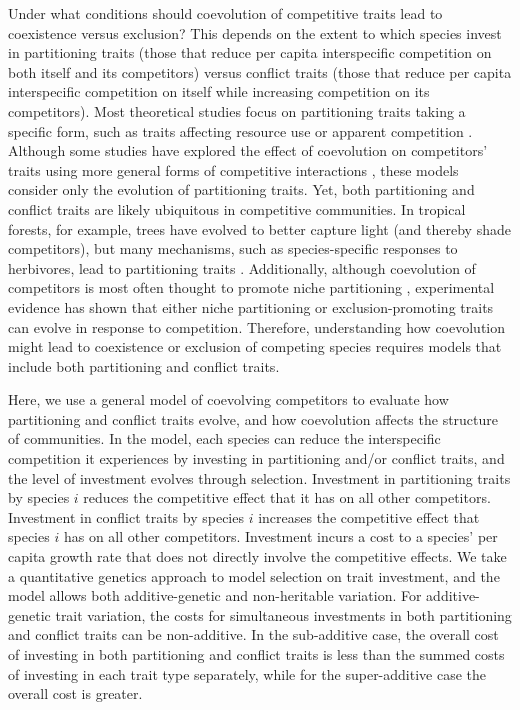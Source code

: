 Under what conditions should coevolution of competitive traits lead to
coexistence versus exclusion? This depends on the extent to which species 
invest in partitioning traits (those that reduce per capita interspecific
competition on both itself and its competitors) versus conflict traits
(those that reduce per capita interspecific competition on itself while
increasing competition on its competitors). Most theoretical studies focus 
on partitioning traits taking a specific form, such as traits affecting 
resource use
\citep[e.g.,][]{Roughgarden1976, Shoresh2008} or apparent
competition \citep[e.g.,][]{Abrams1998, Abrams2002, Schreiber2011}.
Although some studies have explored the effect of coevolution on 
competitors’ traits using more general forms of competitive 
interactions \citep[e.g.,][]{Abrams2013, Pastore2021, Vasseur2011a}, these
models consider only the evolution of partitioning traits. Yet, both
partitioning and conflict traits are likely ubiquitous in competitive
communities. In tropical forests, for example, trees have evolved to
better capture light (and thereby shade competitors), but many
mechanisms, such as species-specific responses to herbivores, lead to
partitioning traits \citep{Wright2002}. Additionally, although coevolution of
competitors is most often thought to promote niche partitioning 
\citep{Pfennig2012}, experimental evidence has shown that either niche
partitioning \citep{Schluter1994, Zuppinger-Dingley2014} or
exclusion-promoting traits \citep{Germain2020, Hart2019, Miller2014, Zhao2016}
can evolve in response to competition. 
Therefore, understanding how coevolution might lead to coexistence or
exclusion of competing species requires models that include both
partitioning and conflict traits.

Here, we use a general model of coevolving competitors to evaluate how
partitioning and conflict traits evolve, and how coevolution affects the
structure of communities. In the model, each species can reduce the
interspecific competition it experiences by investing in partitioning
and/or conflict traits, and the level of investment evolves through
selection. Investment in partitioning traits by species $i$ reduces
the competitive effect that it has on all other competitors.
Investment in conflict traits by species $i$ increases the competitive
effect that species $i$ has on all other competitors. Investment
incurs a cost to a species' per capita growth rate that does not
directly involve the competitive effects. We take a quantitative
genetics approach to model selection on trait investment, and the model
allows both additive-genetic and non-heritable variation. For
additive-genetic trait variation, the costs for simultaneous investments
in both partitioning and conflict traits can be non-additive. In the
sub-additive case, the overall cost of investing in both partitioning
and conflict traits is less than the summed costs of investing in each
trait type separately, while for the super-additive case the overall
cost is greater.

